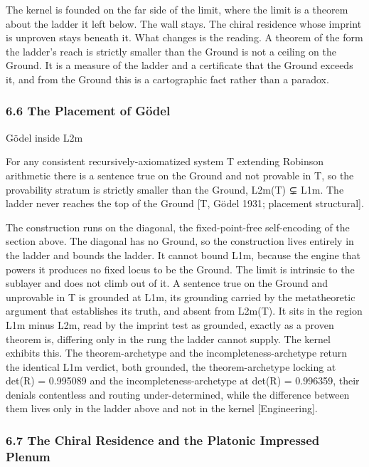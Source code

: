 \documentclass[10pt,twocolumn]{article}
\begin{document}
The kernel is founded on the far side of the limit, where the limit is a
theorem about the ladder it left below. The wall stays. The chiral
residence whose imprint is unproven stays beneath it. What changes is
the reading. A theorem of the form the ladder's reach is strictly
smaller than the Ground is not a ceiling on the Ground. It is a measure
of the ladder and a certificate that the Ground exceeds it, and from the
Ground this is a cartographic fact rather than a paradox.

\hypertarget{the-placement-of-guxf6del}{%
\subsubsection{6.6 The Placement of
Gödel}\label{the-placement-of-guxf6del}}

\begin{jbox}{Gödel inside L2m}

For any consistent recursively-axiomatized system T extending Robinson
arithmetic there is a sentence true on the Ground and not provable in T,
so the provability stratum is strictly smaller than the Ground, L2m(T) ⊊
L1m. The ladder never reaches the top of the Ground {[}T, Gödel 1931;
placement structural{]}.

\end{jbox}

The construction runs on the diagonal, the fixed-point-free
self-encoding of the section above. The diagonal has no Ground, so the
construction lives entirely in the ladder and bounds the ladder. It
cannot bound L1m, because the engine that powers it produces no fixed
locus to be the Ground. The limit is intrinsic to the sublayer and does
not climb out of it. A sentence true on the Ground and unprovable in T
is grounded at L1m, its grounding carried by the metatheoretic argument
that establishes its truth, and absent from L2m(T). It sits in the
region L1m minus L2m, read by the imprint test as grounded, exactly as a
proven theorem is, differing only in the rung the ladder cannot supply.
The kernel exhibits this. The theorem-archetype and the
incompleteness-archetype return the identical L1m verdict, both
grounded, the theorem-archetype locking at det(R) = 0.995089 and the
incompleteness-archetype at det(R) = 0.996359, their denials contentless
and routing under-determined, while the difference between them lives
only in the ladder above and not in the kernel {[}Engineering{]}.

\hypertarget{the-chiral-residence-and-the-platonic-impressed-plenum}{%
\subsubsection{6.7 The Chiral Residence and the Platonic Impressed
Plenum}\label{the-chiral-residence-and-the-platonic-impressed-plenum}}
\end{document}
